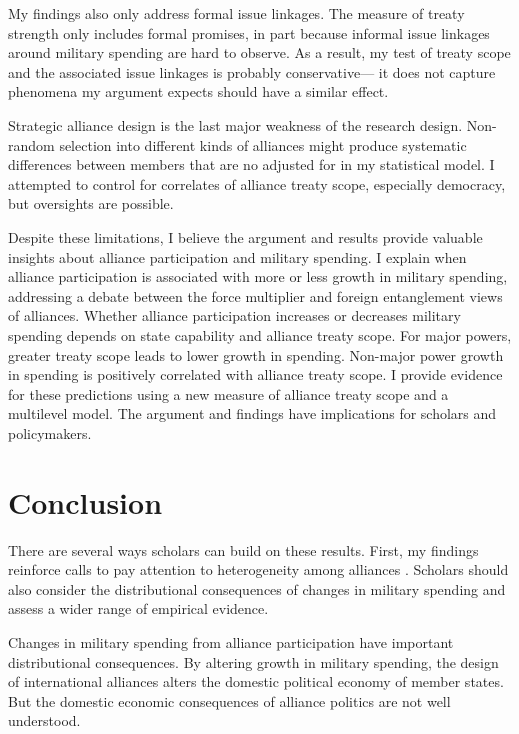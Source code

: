 \documentclass[12pt]{article}
\begin{document}
My findings also only address formal issue linkages. 
The measure of treaty strength only includes formal promises, in part because informal issue linkages around military spending are hard to observe. 
As a result, my test of treaty scope and the associated issue linkages is probably conservative--- it does not capture phenomena my argument expects should have a similar effect. 


Strategic alliance design is the last major weakness of the research design. 
Non-random selection into different kinds of alliances might produce systematic differences between members that are no adjusted for in my statistical model. 
I attempted to control for correlates of alliance treaty scope, especially democracy, but oversights are possible. 


Despite these limitations, I believe the argument and results provide valuable insights about alliance participation and military spending. 
I explain when alliance participation is associated with more or less growth in military spending, addressing a debate between the force multiplier and foreign entanglement views of alliances. 
Whether alliance participation increases or decreases military spending depends on state capability and alliance treaty scope. 
For major powers, greater treaty scope leads to lower growth in spending. 
Non-major power growth in spending is positively correlated with alliance treaty scope. 
I provide evidence for these predictions using a new measure of alliance treaty scope and a multilevel model. 
The argument and findings have implications for scholars and policymakers. 



\section{Conclusion}


There are several ways scholars can build on these results. 
First, my findings reinforce calls to pay attention to heterogeneity among alliances \citep{Leeds2003, DigiuseppePoast2016}.
Scholars should also consider the distributional consequences of changes in military spending and assess a wider range of empirical evidence. 


Changes in military spending from alliance participation have important distributional consequences. 
By altering growth in military spending, the design of international alliances alters the domestic political economy of member states. 
But the domestic economic consequences of alliance politics are not well understood. 
\end{document}
